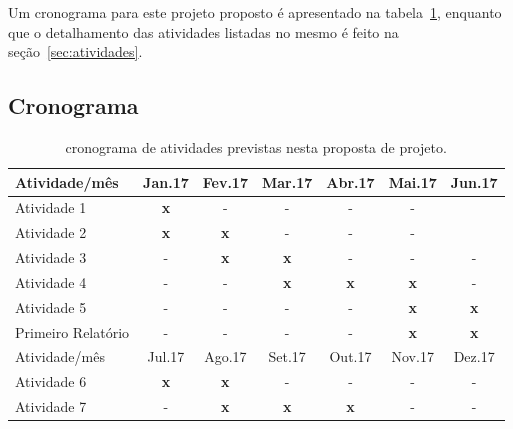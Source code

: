 \documentclass[12pt]{article}
\begin{document}
Um cronograma para este projeto proposto é apresentado na tabela~\ref{tab:cronograma}, enquanto que o detalhamento das atividades listadas no mesmo é feito na seção~\ref{sec:atividades}.

\subsection{Cronograma}

\begin{table}[!ht]
\caption{cronograma de atividades previstas nesta proposta de projeto.} 
\label{tab:cronograma}
\begin{center}
\smallskip
\begin{tabular}{l ccc ccc}
    \toprule
    \small Atividade/mês & \small Jan.17 & \small Fev.17 & \small Mar.17
                         & \small Abr.17 & \small Mai.17 & \small Jun.17
    \\ \hline

    \small Atividade 1   
    & \small {\bf x} & \small - & \small - & \small - & \small - \\

    \small Atividade 2   
    & \small {\bf x} & \small {\bf x} & \small - & \small - 
    & \small - \\

    \small Atividade 3   
    & \small - & \small {\bf x} & \small {\bf x} & \small - & \small -
    & \small - \\

    \small Atividade 4
    & \small - & \small - & \small {\bf x} & \small {\bf x} 
    & \small {\bf x} &  \small - \\

    \small Atividade 5   
    & \small - & \small - & \small - & \small - & \small {\bf x} 
    & \small {\bf x} \\

    \small Primeiro Relatório  
    & \small - & \small - & \small - & \small - & \small {\bf x} 
    & \small {\bf x} \\
    \bottomrule
    \toprule
    \small Atividade/mês & \small Jul.17 & \small Ago.17 & \small Set.17
                         & \small Out.17 & \small Nov.17 & \small Dez.17
    \\ \hline

    \small Atividade 6   
    & \small {\bf x} & \small {\bf x} & \small - & \small - & \small - 
    & \small - \\

    \small Atividade 7
    & \small - & \small {\bf x} & \small {\bf x} & \small{\bf x} 
    & \small - &  \small -\\


\end{tabular}
\end{center}
\end{table}
\end{document}
